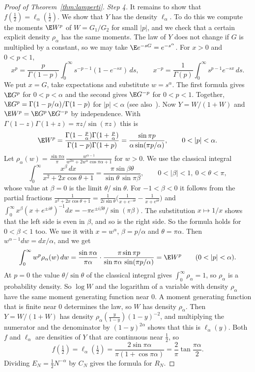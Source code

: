\begin{proof}[Proof of Theorem~\ref{thm:lamperti}]
\emph{Step 4.} It remains to show that $f(\frac12)=\ell_\alpha(\frac12)$. We show that
$Y$ has the density $\ell_\alpha$. To do this we compute the moments $\E W^p$ of
$W=G_1/G_2$ for small $\lvert p\rvert$, and we check that a certain explicit density
$\rho_\alpha$ has the same moments. The law of $Y$ does not change if $G$ is multiplied
by a constant, so we may take $\E e^{-sG}=e^{-s^\alpha}$. For $x>0$ and $0<p<1$,
\[
x^p=\frac p{\Gamma(1-p)}\int_0^\infty s^{-p-1}(1-e^{-sx})\,ds,\qquad
x^{-p}=\frac1{\Gamma(p)}\int_0^\infty s^{p-1}e^{-sx}\,ds .
\]
We put $x=G$, take expectations and substitute $w=s^\alpha$. The first formula gives
$\E G^p$ for $0<p<\alpha$ and the second gives $\E G^{-p}$ for $0<p<1$. Together,
$\E G^p=\Gamma(1-p/\alpha)/\Gamma(1-p)$ for $\lvert p\rvert<\alpha$ (see
also~\cite[Theorem~2.6.3]{zolotarev1986}). Now $Y=W/(1+W)$ and $\E W^p=\E G^p\,\E G^{-p}$
by independence. With $\Gamma(1-z)\Gamma(1+z)=\pi z/\sin(\pi z)$ this is
\[
\E W^p=\frac{\Gamma(1-\frac p\alpha)\Gamma(1+\frac p\alpha)}{\Gamma(1-p)\Gamma(1+p)}
=\frac{\sin\pi p}{\alpha\sin(\pi p/\alpha)},\qquad0<\lvert p\rvert<\alpha .
\]
Let
$\rho_\alpha(w)=\frac{\sin\pi\alpha}\pi\,\frac{w^{\alpha-1}}{w^{2\alpha}+2w^\alpha\cos\pi\alpha+1}$
for $w>0$. We use the classical integral
\[
\int_0^\infty\frac{x^\beta\,dx}{x^2+2x\cos\theta+1}
=\frac{\pi\sin\beta\theta}{\sin\theta\,\sin\pi\beta},
\qquad0<\lvert\beta\rvert<1,\ 0<\theta<\pi,
\]
whose value at $\beta=0$ is the limit $\theta/\sin\theta$. For $-1<\beta<0$ it follows
from the partial fractions
$\frac1{x^2+2x\cos\theta+1}=\frac1{2i\sin\theta}\bigl(\frac1{x+e^{-i\theta}}-\frac1{x+e^{i\theta}}\bigr)$
and
$\int_0^\infty x^\beta(x+e^{\pm i\theta})^{-1}dx=-\pi e^{\pm i\beta\theta}/\sin(\pi\beta)$.
The substitution $x\mapsto1/x$ shows that the left side is even in $\beta$, and so is the
right side. So the formula holds for $0<\beta<1$ too. We use it with $x=w^\alpha$,
$\beta=p/\alpha$ and $\theta=\pi\alpha$. Then $w^{\alpha-1}dw=dx/\alpha$, and we get
\[
\int_0^\infty w^p\rho_\alpha(w)\,dw
=\frac{\sin\pi\alpha}{\pi\alpha}\cdot\frac{\pi\sin\pi p}{\sin\pi\alpha\,\sin(\pi p/\alpha)}
=\E W^p\qquad(0<\lvert p\rvert<\alpha).
\]
At $p=0$ the value $\theta/\sin\theta$ of the classical integral gives
$\int_0^\infty\rho_\alpha=1$, so $\rho_\alpha$ is a probability density. So $\log W$ and the
logarithm of a variable with density $\rho_\alpha$ have the same moment generating
function near $0$. A moment generating function that is finite near $0$ determines the
law, so $W$ has density $\rho_\alpha$. Then $Y=W/(1+W)$ has density
$\rho_\alpha(\frac y{1-y})(1-y)^{-2}$, and multiplying the numerator and the denominator
by $(1-y)^{2\alpha}$ shows that this is $\ell_\alpha(y)$. Both $f$ and $\ell_\alpha$ are
densities of $Y$ that are continuous near $\frac12$, so
\[
f(\tfrac12)=\ell_\alpha(\tfrac12)=\frac{2\sin\pi\alpha}{\pi(1+\cos\pi\alpha)}
=\frac2\pi\tan\frac{\pi\alpha}2 .
\]
Dividing $E_N=\frac12N^{-\alpha}$ by $C_N$ gives the formula for $R_N$.
\end{proof}
